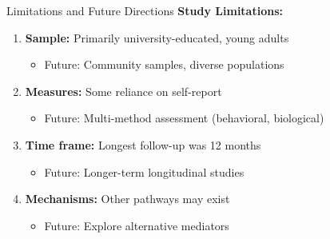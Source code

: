 \documentclass[aspectratio=169,12pt]{beamer}
\begin{document}
\begin{frame}{Limitations and Future Directions}
  \textbf{Study Limitations:}
  \begin{enumerate}
    \item \textbf{Sample:} Primarily university-educated, young adults
    \begin{itemize}
      \item Future: Community samples, diverse populations
    \end{itemize}
    
    \item \textbf{Measures:} Some reliance on self-report
    \begin{itemize}
      \item Future: Multi-method assessment (behavioral, biological)
    \end{itemize}
    
    \item \textbf{Time frame:} Longest follow-up was 12 months
    \begin{itemize}
      \item Future: Longer-term longitudinal studies
    \end{itemize}
    
    \item \textbf{Mechanisms:} Other pathways may exist
    \begin{itemize}
      \item Future: Explore alternative mediators
    \end{itemize}
  \end{enumerate}
\end{frame}
\end{document}
